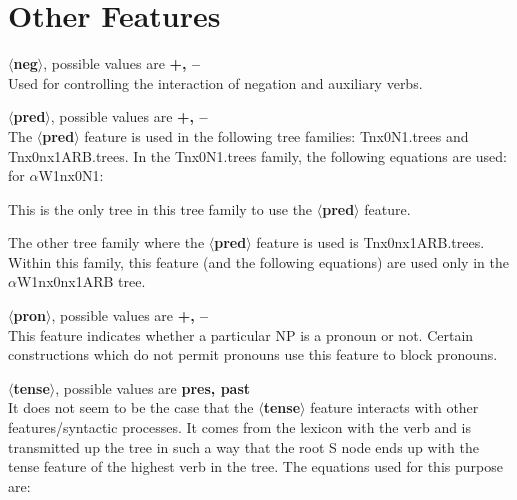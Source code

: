  
\section{Other Features} 
{\bf $\langle$neg$\rangle$}, possible values are {\bf +, --}\\ 
Used for controlling the interaction of negation and auxiliary verbs. 
 
\noindent 
{\bf $\langle$pred$\rangle$}, possible values are {\bf +, --}\\ 
The {\bf $\langle$pred$\rangle$} feature is used in the following tree 
families: Tnx0N1.trees and Tnx0nx1ARB.trees. 
In the Tnx0N1.trees family, the following equations are used:\\ 
for $\alpha$W1nx0N1: 
 
\beginsentences
{}\label{ex:251} 
\label{ex:252} 
\label{ex:253} 
\label{ex:254} 
\endsentences

 
This is the only tree in this tree family to use the 
{\bf $\langle$pred$\rangle$} feature. 
 
The other tree family where the {\bf $\langle$pred$\rangle$} feature is 
used is Tnx0nx1ARB.trees.  Within this family, this feature (and the 
following equations) are used only in the $\alpha$W1nx0nx1ARB tree. 
 
\beginsentences
{}\label{ex:255} 
\label{ex:256} 
\label{ex:257} 
\label{ex:258} 
\endsentences

 
\noindent 
{\bf $\langle$pron$\rangle$}, possible values are {\bf +, --}\\ 
This feature indicates whether a particular NP is a pronoun or not. 
Certain constructions which do not permit pronouns use this 
feature to block pronouns. 
 
\noindent 
{\bf $\langle$tense$\rangle$}, possible values are {\bf pres, past}\\ 
It does not seem to be the case that the {\bf $\langle$tense$\rangle$} 
feature interacts with other features/syntactic processes. It 
comes from the lexicon with the verb and is transmitted up the 
tree in such a way that the root S node ends up with the 
tense feature of the highest verb in the tree. The equations 
used for this purpose are: 
 
\beginsentences
{}\label{ex:259} 
\label{ex:260} 
\endsentences

 
 
 
